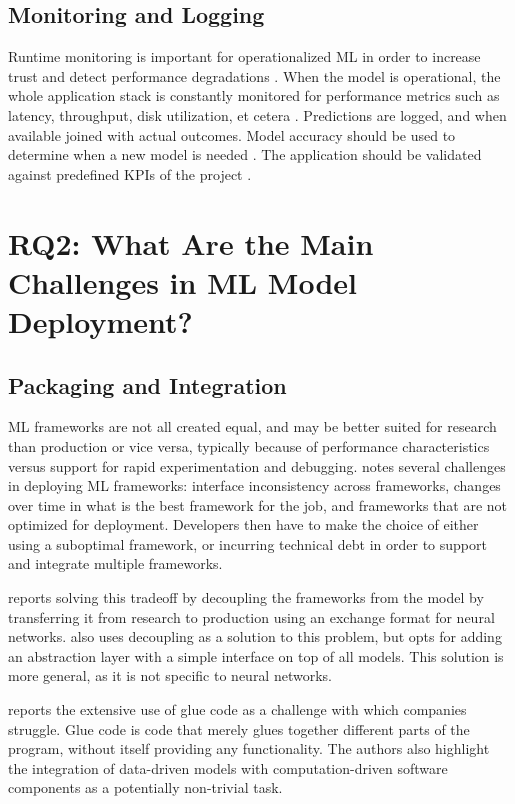 \subsection{Monitoring and Logging}
Runtime monitoring is important for operationalized ML in order to increase trust and detect performance degradations \cite{Rausch2019, Li2017}.
When the model is operational, the whole application stack is constantly monitored for performance metrics such as latency, throughput, disk utilization, et cetera \cite{Ruf2021, Peticolas2019}.
Predictions are logged, and when available joined with actual outcomes\cite{Li2017}.
Model accuracy should be used to determine when a new model is needed \cite{Peticolas2019}.
The application should be validated against predefined KPIs of the project \cite{Ruf2021}.

\section{RQ2: What Are the Main Challenges in ML Model Deployment?}
\subsection{Packaging and Integration}
ML frameworks are not all created equal, and may be better suited for research than production or vice versa, typically because of performance characteristics versus support for rapid experimentation and debugging.
\cite{Crankshaw2017} notes several challenges in deploying ML frameworks: interface inconsistency across frameworks, changes over time in what is the best framework for the job, and frameworks that are not optimized for deployment.
Developers then have to make the choice of either using a suboptimal framework, or incurring technical debt in order to support and integrate multiple frameworks.

\cite{Hazelwood2018} reports solving this tradeoff by decoupling the frameworks from the model by transferring it from research to production using an exchange format for neural networks.
\cite{Crankshaw2017} also uses decoupling as a solution to this problem, but opts for adding an abstraction layer with a simple interface on top of all models.
This solution is more general, as it is not specific to neural networks.

\cite{Bosch2021} reports the extensive use of glue code as a challenge with which companies struggle.
Glue code is code that merely glues together different parts of the program, without itself providing any functionality.
The authors also highlight the integration of data-driven models with computation-driven software components as a potentially non-trivial task.

